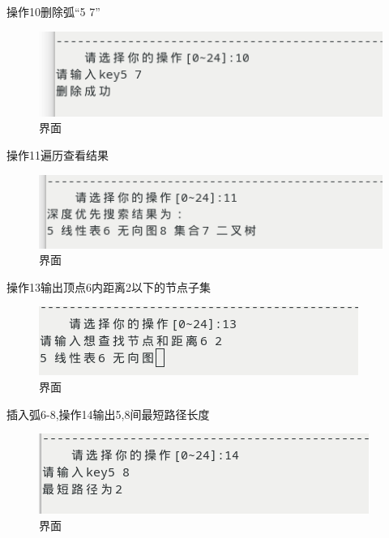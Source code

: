 \documentclass[supercite]{Experimental_Report}
\theoremstyle{definition}
\begin{document}
操作10删除弧“5 7”

\begin{figure}[!htb]
	\begin{center}
		\includegraphics[scale=0.60]{images/2-20.png}
		\caption{界面}
		\label{fig2-20}
		\end{center}
\end{figure}

操作11遍历查看结果

\begin{figure}[!htb]
	\begin{center}
		\includegraphics[scale=0.60]{images/2-21.png}
		\caption{界面}
		\label{fig2-21}
		\end{center}
\end{figure}

操作13输出顶点6内距离2以下的节点子集

\begin{figure}[!htb]
	\begin{center}
		\includegraphics[scale=0.60]{images/2-22.png}
		\caption{界面}
		\label{fig2-22}
		\end{center}
\end{figure}

插入弧6-8,操作14输出5,8间最短路径长度

\begin{figure}[!htb]
	\begin{center}
		\includegraphics[scale=0.60]{images/2-23.png}
		\caption{界面}
		\label{fig2-23}
		\end{center}
\end{figure}
\end{document}
